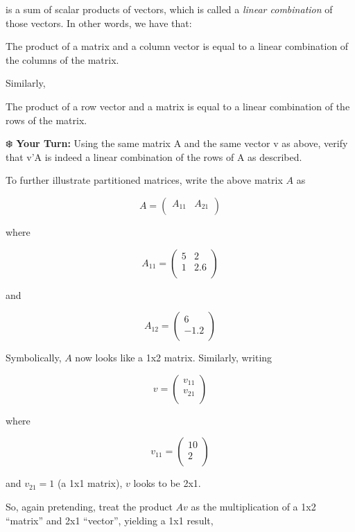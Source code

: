 \documentclass[
  letterpaper,
  DIV=11,
  numbers=noendperiod,
  oneside]{scrreprt}
\begin{document}
is a sum of scalar products of vectors, which is called a \emph{linear
combination} of those vectors. In other words, we have that:

The product of a matrix and a column vector is equal to a linear
combination of the columns of the matrix.

Similarly,

The product of a row vector and a matrix is equal to a linear
combination of the rows of the matrix.

❄️ \textbf{Your Turn:} Using the same matrix A and the same vector v as
above, verify that v'A is indeed a linear combination of the rows of A
as described.

To further illustrate partitioned matrices, write the above matrix \(A\)
as

\[
A = 
\left (
\begin{array}{r}
A_{11} & A_{21} \\
\end{array}
\right )
\]

where

\[
A_{11} = 
 \left (
 \begin{array}{rr}
 5 & 2 \\
 1 & 2.6 \\
 \end{array}
 \right )
\]

and

\[
A_{12} = 
 \left (
 \begin{array}{rr}
 6 \\
 -1.2 \\
 \end{array}
 \right )
\]

Symbolically, \(A\) now looks like a 1x2 matrix. Similarly, writing

\[
v = 
 \left (
 \begin{array}{rrr}
 v_{11} \\
 v_{21} \\
 \end{array}
 \right )
\]

where

\[
 v_{11} = 
 \left (
 \begin{array}{rr}
 10 \\
 2 \\
 \end{array}
 \right )
 \]

and \(v_{21} = 1\) (a 1x1 matrix), \(v\) looks to be 2x1.

So, again pretending, treat the product \(Av\) as the multiplication of
a 1x2 ``matrix'' and 2x1 ``vector'', yielding a 1x1 result,
\end{document}
